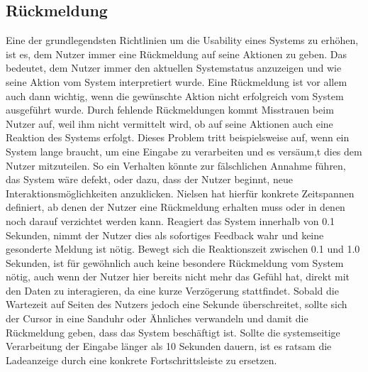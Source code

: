 \subsection*{Rückmeldung}

Eine der grundlegendsten Richtlinien um die Usability eines Systems zu erhöhen, ist es, dem Nutzer immer eine Rückmeldung auf seine Aktionen zu geben.
Das bedeutet, dem Nutzer immer den aktuellen Systemstatus anzuzeigen und wie seine Aktion vom System interpretiert wurde.
Eine Rückmeldung ist vor allem auch dann wichtig, wenn die gewünschte Aktion nicht erfolgreich vom System ausgeführt wurde.
Durch fehlende Rückmeldungen kommt Misstrauen beim Nutzer auf, weil ihm nicht vermittelt wird, ob auf seine Aktionen auch eine Reaktion des Systems erfolgt\cite{Knight.2019c}.
Dieses Problem tritt beispielsweise auf, wenn ein System lange braucht, um eine Eingabe zu verarbeiten und es versäum,t dies dem Nutzer mitzuteilen.
So ein Verhalten könnte zur fälschlichen Annahme führen, das System wäre defekt, oder dazu, dass der Nutzer beginnt, neue Interaktionsmöglichkeiten anzuklicken.
Nielsen hat hierfür konkrete Zeitspannen definiert, ab denen der Nutzer eine Rückmeldung erhalten muss oder in denen noch darauf verzichtet werden kann.\cite{.b}
Reagiert das System innerhalb von 0.1 Sekunden, nimmt der Nutzer dies als sofortiges Feedback wahr und keine gesonderte Meldung ist nötig.
Bewegt sich die Reaktionszeit zwischen 0.1 und 1.0 Sekunden, ist für gewöhnlich auch keine besondere Rückmeldung vom System nötig, auch wenn der Nutzer hier bereits nicht mehr das Gefühl hat, direkt mit den Daten zu interagieren, da eine kurze Verzögerung stattfindet.
Sobald die Wartezeit auf Seiten des Nutzers jedoch eine Sekunde überschreitet, sollte sich der Cursor in eine Sanduhr oder Ähnliches verwandeln und damit die Rückmeldung geben, dass das System beschäftigt ist.
Sollte die systemseitige Verarbeitung der Eingabe länger als 10 Sekunden dauern, ist es ratsam die Ladeanzeige durch eine konkrete Fortschrittsleiste zu ersetzen.

